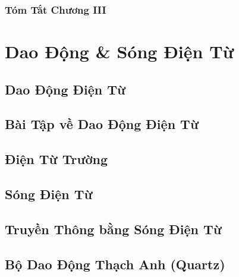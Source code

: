 \documentclass{article}
\numberwithin{equation}{section}
\begin{document}

\subsubsection{Tóm Tắt Chương III}


\section{Dao Động \& Sóng Điện Từ}

\subsection{Dao Động Điện Từ}


\subsection{Bài Tập về Dao Động Điện Từ}


\subsection{Điện Từ Trường}


\subsection{Sóng Điện Từ}


\subsection{Truyền Thông bằng Sóng Điện Từ}


\subsection{Bộ Dao Động Thạch Anh (Quartz)}
\end{document}

